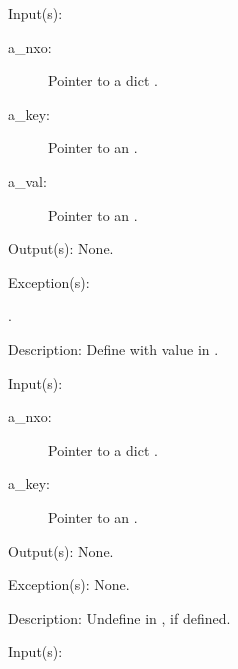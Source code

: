 \begin{capi}
\begin{capilist}
	\end{capilist}
\label{nxo_dict_def}
	\begin{capilist}
	\item[Input(s): ]
		\begin{description}\item[]
		\item[a\_nxo: ]
			Pointer to a dict .
		\item[a\_key: ]
			Pointer to an .
		\item[a\_val: ]
			Pointer to an .
		\end{description}
	\item[Output(s): ] None.
	\item[Exception(s): ]
		\begin{description}\item[]
		\item[.]
		\end{description}
	\item[Description: ]
		Define  with value  in .
	\end{capilist}
\label{nxo_dict_undef}
	\begin{capilist}
	\item[Input(s): ]
		\begin{description}\item[]
		\item[a\_nxo: ]
			Pointer to a dict \classname{nxo}.
		\item[a\_key: ]
			Pointer to an \classname{nxo}.
		\end{description}
	\item[Output(s): ] None.
	\item[Exception(s): ] None.
	\item[Description: ]
		Undefine  in , if defined.
	\end{capilist}
\label{nxo_dict_lookup}
	\begin{capilist}
	\item[Input(s): ]
		\begin{description}\item[]

\end{description}
\end{capilist}
\end{capi}
